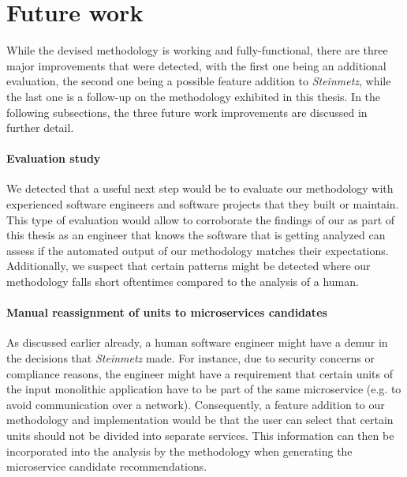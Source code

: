 \documentclass[12pt,a4paper]{report}
\begin{document}
\section{Future work} \label{sect:future-work}

While the devised methodology is working and fully-functional, there are three
major improvements that were detected, with the first one being an additional
evaluation, the second one being a possible feature addition to \textit{Steinmetz},
while the last one is a follow-up on the methodology exhibited in this thesis.
In the following subsections, the three future work improvements are discussed in
further detail.

\paragraph{Evaluation study}
We detected that a useful next step would be to evaluate our methodology
with experienced software engineers and software projects that they built
or maintain. This type of evaluation would allow to corroborate the findings
of our \textit{} as part of this thesis as an engineer
that knows the software that is getting analyzed can assess if the automated
output of our methodology matches their expectations. Additionally, we suspect
that certain patterns might be detected where our methodology falls short oftentimes
compared to the analysis of a human.

\paragraph{Manual reassignment of units to microservices candidates}
As discussed earlier already, a human software engineer might have a demur
in the decisions that \textit{Steinmetz} made. For instance, due to
security concerns or compliance reasons, the engineer might have a requirement
that certain units of the input monolithic application have to be part of
the same microservice (e.g. to avoid communication over a network).
Consequently, a feature addition to our methodology and implementation
would be that the user can select that certain units should not be divided
into separate services. This information can then be incorporated into the
analysis by the methodology when generating the microservice candidate
recommendations.
\end{document}
